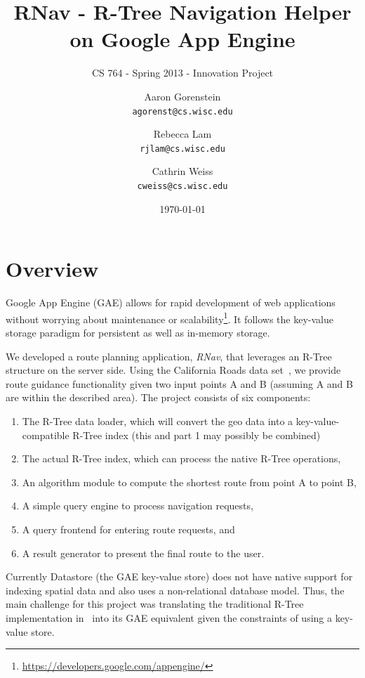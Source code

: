 \documentclass{scrartcl}
\newcommand{\email}[1]{\texttt{#1}}
\begin{document}
\title{RNav - R-Tree Navigation Helper on Google App Engine}
\subtitle{CS 764 - Spring 2013 - Innovation Project}

\author{
Aaron Gorenstein\\
	\email{agorenst@cs.wisc.edu}
\and
Rebecca Lam\\
	\email{rjlam@cs.wisc.edu}
\and
Cathrin Weiss\\
	\email{cweiss@cs.wisc.edu}       
}

\date{\today}

\maketitle

\section{Overview}
\label{sec:intro}
Google App Engine (GAE) allows for rapid development of web applications without worrying about maintenance or scalability\footnote{\url{https://developers.google.com/appengine/}}. It follows the key-value storage paradigm for persistent as well as in-memory storage. 

We developed a route planning application, \emph{RNav}, that leverages an R-Tree structure on the server side. Using the California Roads data set~\cite{Online:cardata}, we provide route guidance functionality given two input points A and B (assuming A and B are within the described area). The project consists of six components:

\begin{enumerate}
\item The R-Tree data loader, which will convert the geo data into a key-value-compatible R-Tree index (this and part 1 may possibly be combined)
\item The actual R-Tree index, which can process the native R-Tree operations,
\item An algorithm module to compute the shortest route from point A to point B,
\item A simple query engine to process navigation requests, 
\item A query frontend for entering route requests, and
\item A result generator to present the final route to the user. 
\end{enumerate}

Currently Datastore (the GAE key-value store) does not have native support for indexing spatial data and also uses a non-relational database model. Thus, the main challenge for this project was translating the traditional R-Tree implementation in~\cite{DBLP:conf/sigmod/Guttman84} into its GAE equivalent given the constraints of using a key-value store.
\end{document}
